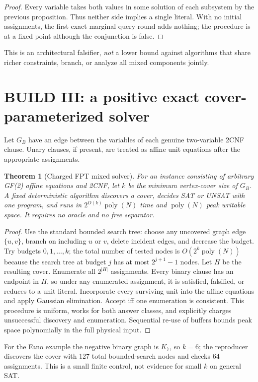 \documentclass[11pt]{article}
\newtheorem{theorem}{Theorem}
\begin{document}
\begin{proof}
Every variable takes both values in some solution of each subsystem by the previous proposition. Thus neither side implies a single literal. With no initial assignments, the first exact marginal query round adds nothing; the procedure is at a fixed point although the conjunction is false.
\end{proof}
This is an architectural falsifier, \emph{not} a lower bound against algorithms that share richer constraints, branch, or analyze all mixed components jointly.

\section{BUILD III: a positive exact cover-parameterized solver}
Let $G_B$ have an edge between the variables of each genuine two-variable 2CNF clause. Unary clauses, if present, are treated as affine unit equations after the appropriate assignments.
\begin{theorem}[Charged FPT mixed solver]
For an instance consisting of arbitrary GF(2) affine equations and 2CNF, let $k$ be the minimum vertex-cover size of $G_B$. A fixed deterministic algorithm discovers a cover, decides SAT or UNSAT with one program, and runs in $2^{O(k)}\operatorname{poly}(N)$ time and $\operatorname{poly}(N)$ peak writable space. It requires no oracle and no free separator.
\end{theorem}
\begin{proof}
Use the standard bounded search tree: choose any uncovered graph edge $\{u,v\}$, branch on including $u$ or $v$, delete incident edges, and decrease the budget. Try budgets $0,1,\dots,k$; the total number of tested nodes is $O(2^k\operatorname{poly}(N))$ because the search tree at budget $j$ has at most $2^{j+1}-1$ nodes. Let $H$ be the resulting cover. Enumerate all $2^{|H|}$ assignments. Every binary clause has an endpoint in $H$, so under any enumerated assignment, it is satisfied, falsified, or reduces to a unit literal. Incorporate every surviving unit into the affine equations and apply Gaussian elimination. Accept iff one enumeration is consistent. This procedure is uniform, works for both answer classes, and explicitly charges unsuccessful discovery and enumeration. Sequential re-use of buffers bounds peak space polynomially in the full physical input.
\end{proof}
For the Fano example the negative binary graph is $K_7$, so $k=6$; the reproducer discovers the cover with 127 total bounded-search nodes and checks 64 assignments. This is a small finite control, not evidence for small $k$ on general SAT.
\end{document}
